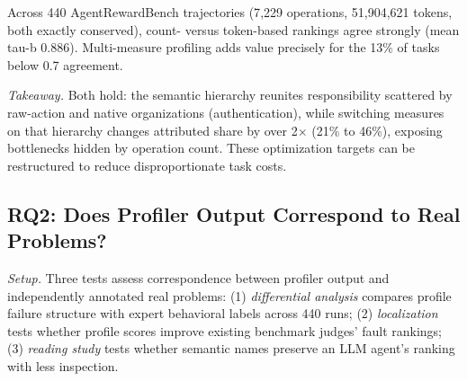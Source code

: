 \documentclass[sigconf,nonacm]{acmart}
\newif\ifshowappendix
\newcommand{\appnote}[1]{\ifshowappendix{} (#1)\fi}
\begin{document}
Across 440 AgentRewardBench trajectories (7{,}229 operations, 51{,}904{,}621 tokens, both exactly conserved), count- versus token-based rankings agree strongly (mean tau-b 0.886).
Multi-measure profiling adds value precisely for the 13\% of tasks below 0.7 agreement\appnote{details in Appendix~\ref{app:rq1}}.

\emph{Takeaway.} Both hold: the semantic hierarchy reunites responsibility scattered by raw-action and native organizations (authentication), while switching measures on that hierarchy changes attributed share by over 2$\times$ (21\% to 46\%), exposing bottlenecks hidden by operation count. These optimization targets can be restructured to reduce disproportionate task costs.


\subsection{RQ2: Does Profiler Output Correspond to Real Problems?}

\emph{Setup.} Three tests assess correspondence between profiler output and independently annotated real problems: (1) \emph{differential analysis} compares profile failure structure with expert behavioral labels across 440 runs; (2) \emph{localization} tests whether profile scores improve existing benchmark judges' fault rankings; (3) \emph{reading study} tests whether semantic names preserve an LLM agent's ranking with less inspection.
\end{document}
